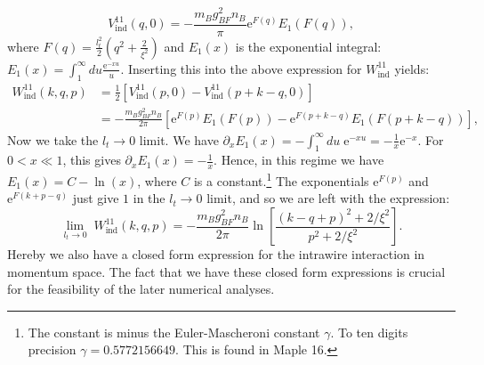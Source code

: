 \begin{equation}
V^{11}_{\text{ind}}(q, 0) = -\frac{m_Bg_{BF}^2n_B}{\pi} \text{e}^{F(q)} E_1(F(q)),
\label{eq.V11indq.zerofrequency.ltnonzero}
\end{equation}
where $F(q) = \frac{l_t^2}{2}\left(q^2 + \frac{2}{\xi^2} \right)$ and $E_1(x)$ is the exponential integral: $E_1(x) = \int_1^\infty du \frac{\text{e}^{-xu}}{u}$. Inserting this into the above expression for $W^{11}_{\text{ind}}$ yields:
\begin{align}
W^{11}_{\text{ind}}(k, q, p) &= \frac{1}{2}\left[V^{11}_\text{ind}(p, 0) - V^{11}_\text{ind}(p + k - q, 0)\right] \nonumber \\
&= -\frac{m_Bg_{BF}^2n_B}{2\pi}\left[ \text{e}^{F(p)} E_1(F(p)) - \text{e}^{F(p + k - q)} E_1(F(p + k - q)) \right], \nonumber
\end{align}
Now we take the $l_t \to 0$ limit. We have $\partial_x E_1(x) = -\int_1^{\infty}du\; \text{e}^{-xu} = -\frac{1}{x}\text{e}^{-x}$. For $0 < x \ll 1$, this gives $\partial_xE_1(x) = -\frac{1}{x}$. Hence, in this regime we have $E_1(x) = C -\ln(x)$, where $C$ is a constant.\footnote{The constant is minus the Euler-Mascheroni constant $\gamma$. To ten digits precision $\gamma = 0.5772156649$. This is found in Maple 16.} The exponentials $\text{e}^{F(p)}$ and $\text{e}^{F(k + p - q)}$ just give $1$ in the $l_t \to 0$ limit, and so we are left with the expression:
\begin{equation}
\lim_{l_t \to 0} \; W^{11}_{\text{ind}}(k, q, p) = -\frac{m_Bg_{BF}^2n_B}{2\pi} \ln\left[\frac{(k - q + p)^2 + 2/\xi^2}{p^2 + 2/\xi^2}\right].
\label{eq.Wkqp.scattering.amplitude.lt=0} 
\end{equation}
Hereby we also have a closed form expression for the intrawire interaction in momentum space. The fact that we have these closed form expressions is crucial for the feasibility of the later numerical analyses.




